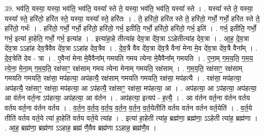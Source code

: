 \documentclass[17pt]{extarticle}
\begin{document}
39. भव॑ति॒ यस्या॒ यस्या॒ भव॑ति॒ भव॑ति॒ यस्या᳚ स्ते ते॒ यस्या॒ भव॑ति॒ भव॑ति॒ यस्या᳚ स्ते । . यस्या᳚ स्ते ते॒ यस्या॒ यस्या᳚ स्ते॒ हरि॑तो॒ हरि॑त स्ते॒ यस्या॒ यस्या᳚ स्ते॒ हरि॑तः । . ते॒ हरि॑तो॒ हरि॑त स्ते ते॒ हरि॑तो॒ गर्भो॒ गर्भो॒ हरि॑त स्ते ते॒ हरि॑तो॒ गर्भः॑ । . हरि॑तो॒ गर्भो॒ गर्भो॒ हरि॑तो॒ हरि॑तो॒ गर्भ॒ इतीति॒ गर्भो॒ हरि॑तो॒ हरि॑तो॒ गर्भ॒ इति॑ । . गर्भ॒ इतीति॒ गर्भो॒ गर्भ॒ इत्या॑ हा॒हेति॒ गर्भो॒ गर्भ॒ इत्या॑ह । . इत्या॑हा॒हे तीत्या॑ह देव॒त्रा दे॑व॒त्रा ऽऽहेतीत्या॑ह देव॒त्रा । . आ॒ह॒ दे॒व॒त्रा दे॑व॒त्रा ऽऽहा॑ह देव॒त्रैवैव दे॑व॒त्रा ऽऽहा॑ह देव॒त्रैव । . दे॒व॒त्रै वैव दे॑व॒त्रा दे॑व॒त्रै वैना॑ मेना मे॒व दे॑व॒त्रा दे॑व॒त्रै वैना᳚म् । . दे॒व॒त्रेति॑ देव - त्रा । . ए॒वैना॑ मेना मे॒वैवैना᳚म् गमयति गमय त्येना मे॒वैवैना᳚म् गमयति । . ए॒ना॒म् ग॒म॒य॒ति॒ ग॒म॒य॒ त्ये॒ना॒ मे॒ना॒म् ग॒म॒य॒ति॒ रक्ष॑साꣳ॒॒ रक्ष॑साम् गमय त्येना मेनाम् गमयति॒ रक्ष॑साम् । . ग॒म॒य॒ति॒ रक्ष॑साꣳ॒॒ रक्ष॑साम् गमयति गमयति॒ रक्ष॑सा॒ मप॑हत्या॒ अप॑हत्यै॒ रक्ष॑साम् गमयति गमयति॒ रक्ष॑सा॒ मप॑हत्यै । . रक्ष॑सा॒ मप॑हत्या॒ अप॑हत्यै॒ रक्ष॑साꣳ॒॒ रक्ष॑सा॒ मप॑हत्या॒ आ ऽप॑हत्यै॒ रक्ष॑साꣳ॒॒ रक्ष॑सा॒ मप॑हत्या॒ आ । . अप॑हत्या॒ आ ऽप॑हत्या॒ अप॑हत्या॒ आ व॑र्तन वर्त॒ना ऽप॑हत्या॒ अप॑हत्या॒ आ व॑र्तन । . अप॑हत्या॒ इत्यप॑ - ह॒त्यै॒ । . आ व॑र्तन वर्त॒ना व॑र्तन वर्तय वर्तय वर्त॒ना व॑र्तन वर्तय । . व॒र्त॒न॒ व॒र्त॒य॒ व॒र्त॒य॒ व॒र्त॒न॒ व॒र्त॒न॒ व॒र्त॒येतीति॑ वर्तय वर्तन वर्तन वर्त॒येति॑ । . व॒र्त॒ये तीति॑ वर्तय वर्त॒ये त्या॑ हा॒हेति॑ वर्तय वर्त॒ये त्या॑ह । . इत्या॑ हा॒हेती त्या॑ह॒ ब्रह्म॑णा॒ ब्रह्म॑णा॒ ऽऽहेती त्या॑ह॒ ब्रह्म॑णा । . आ॒ह॒ ब्रह्म॑णा॒ ब्रह्म॑णा ऽऽहाह॒ ब्रह्म॑ णै॒वैव ब्रह्म॑णा ऽऽहाह॒ ब्रह्म॑णै॒व । \newline
\pagebreak
{}
\end{document}
